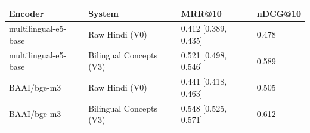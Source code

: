 \begin{tabular}{llll}
\toprule
Encoder & System & MRR@10 & nDCG@10 \\
\midrule
multilingual-e5-base & Raw Hindi (V0) & 0.412 [0.389, 0.435] & 0.478 \\
multilingual-e5-base & Bilingual Concepts (V3) & 0.521 [0.498, 0.546] & 0.589 \\
BAAI/bge-m3 & Raw Hindi (V0) & 0.441 [0.418, 0.463] & 0.505 \\
BAAI/bge-m3 & Bilingual Concepts (V3) & 0.548 [0.525, 0.571] & 0.612 \\
\bottomrule
\end{tabular}
